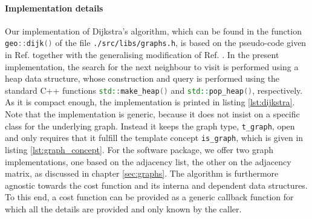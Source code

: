 \paragraph{Implementation details}
Our implementation of Dijkstra's algorithm, which can be found in the function 
\lstinline[language=C++]|geo::dijk()| of the file \lstinline|./src/libs/graphs.h|, is based on the 
pseudo-code given in Ref. \cite[p. 17]{FUH_algo_graphs_2021} together with the generalising modification of 
Ref. \cite[p. 285]{Erickson2019}. In the present implementation, the search for the next neighbour
to visit is performed using a heap data structure, whose construction and query is performed
using the standard C++ functions \lstinline[language=C++]|std::make_heap()| and 
\lstinline[language=C++]|std::pop_heap()|, respectively.
As it is compact enough, the implementation is printed in listing \ref{lst:dijkstra}.
Note that the implementation is generic, because it does not insist on a specific class
for the underlying graph. Instead it keeps the graph type, \lstinline[language=C++]|t_graph|, open and
only requires that it fulfill the template concept \lstinline[language=C++]|is_graph|, which is
given in listing \ref{lst:graph_concept}.
For the software package, we offer two graph implementations, one based on the adjacency list, the
other on the adjacency matrix, as discussed in chapter \ref{sec:graphs}.
The algorithm is furthermore agnostic towards the cost function and its interna and dependent 
data structures. To this end, a cost function can be provided as a generic callback function 
for which all the details are provided and only known by the caller.


